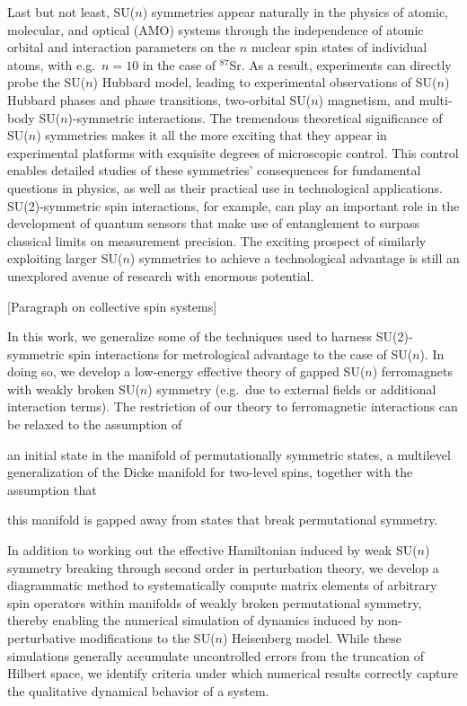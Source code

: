 \documentclass[nofootinbib,notitlepage,11pt]{revtex4-2}
\newcommand{\1}{\mathds{1}}
\newcommand{\red}[1]{{\color{red} #1}}
\begin{document}
Last but not least, SU($n$) symmetries appear naturally in the physics
of atomic, molecular, and optical (AMO)
systems\cite{gorshkov2010twoorbital, beverland2016realizing,
  cazalilla2014ultracold, taie2012su, hofrichter2016direct,
  cappellini2014direct, scazza2014observation, zhang2014spectroscopic,
  goban2018emergence, perlin2019effective} through the independence of
atomic orbital and interaction parameters on the $n$ nuclear spin
states of individual atoms, with e.g.~$n=10$ in the case of
${}^{87}$Sr.  As a result, experiments can directly probe the SU($n$)
Hubbard model, leading to experimental observations of SU($n$) Hubbard
phases and phase transitions\cite{taie2012su, hofrichter2016direct},
two-orbital SU($n$) magnetism\cite{cappellini2014direct,
  scazza2014observation, zhang2014spectroscopic}, and multi-body
SU($n$)-symmetric interactions\cite{goban2018emergence,
  perlin2019effective}.  The tremendous theoretical significance of
SU($n$) symmetries makes it all the more exciting that they appear in
experimental platforms with exquisite degrees of microscopic control.
This control enables detailed studies of these symmetries'
consequences for fundamental questions in physics, as well as their
practical use in technological applications.  SU(2)-symmetric spin
interactions, for example, can play an important role in the
development of quantum sensors that make use of entanglement to
surpass classical limits on measurement
precision\cite{he2019engineering, perlin2020spin}.
The exciting prospect of similarly exploiting larger SU($n$)
symmetries to achieve a technological advantage is still an unexplored
avenue of research with enormous potential.

\red{[Paragraph on collective spin systems]}

In this work, we generalize some of the techniques used to harness
SU(2)-symmetric spin interactions for metrological advantage to the
case of SU($n$).  In doing so, we develop a low-energy effective
theory of gapped SU($n$) ferromagnets with weakly broken SU($n$)
symmetry (e.g.~due to external fields or additional interaction
terms).  The restriction of our theory to ferromagnetic interactions
can be relaxed to the assumption of
\begin{enumerate*}
\item an initial state in the manifold of permutationally symmetric
  states, a multilevel generalization of the Dicke manifold for
  two-level spins, together with the assumption that
\item this manifold is gapped away from states that break
  permutational symmetry.
\end{enumerate*}
In addition to working out the effective Hamiltonian induced by weak
SU($n$) symmetry breaking through second order in perturbation theory,
we develop a diagrammatic method to systematically compute matrix
elements of arbitrary spin operators within manifolds of weakly broken
permutational symmetry, thereby enabling the numerical simulation of
dynamics induced by non-perturbative modifications to the SU($n$)
Heisenberg model.  While these simulations generally accumulate
uncontrolled errors from the truncation of Hilbert space, we identify
criteria under which numerical results correctly capture the
qualitative dynamical behavior of a system.
\end{document}
